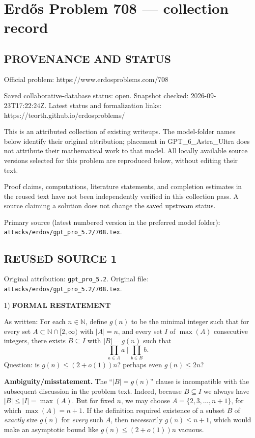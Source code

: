 \section*{Erd\H{o}s Problem 708 --- collection record}

\subsection*{PROVENANCE AND STATUS}
Official problem: https://www.erdosproblems.com/708

Saved collaborative-database status: open.
Snapshot checked: 2026-09-23T17:22:24Z.
Latest status and formalization links: https://teorth.github.io/erdosproblems/

This is an attributed collection of existing writeups. The model-folder names below identify their original attribution; placement in GPT\_6\_Astra\_Ultra does not attribute their mathematical work to that model. All locally available source versions selected for this problem are reproduced below, without editing their text.

Proof claims, computations, literature statements, and completion estimates in the reused text have not been independently verified in this collection pass. A source claiming a solution does not change the saved upstream status.

Primary source (latest numbered version in the preferred model folder): \texttt{attacks/erdos/gpt\_pro\_5.2/708.tex}.

\subsection*{REUSED SOURCE 1}
Original attribution: \texttt{gpt\_pro\_5.2}.
Original file: \texttt{attacks/erdos/gpt\_pro\_5.2/708.tex}.


1) \textbf{FORMAL RESTATEMENT}

As written:
For each $n\in\mathbb{N}$, define $g(n)$ to be the minimal integer such that for every set $A\subset\mathbb{N}\cap[2,\infty)$ with $|A|=n$, and every set $I$ of $\max(A)$ consecutive integers, there exists $B\subseteq I$ with $|B|=g(n)$ such that
\[
\prod_{a\in A} a\ \big|\ \prod_{b\in B} b.
\]
Question: is $g(n)\le (2+o(1))n$? perhaps even $g(n)\le 2n$?

\textbf{Ambiguity/misstatement.}
The ``$|B|=g(n)$'' clause is incompatible with the subsequent discussion in the problem text.
Indeed, because $B\subseteq I$ we always have $|B|\le |I|=\max(A)$.
But for fixed $n$, we may choose $A=\{2,3,\dots,n+1\}$, for which $\max(A)=n+1$.
If the definition required existence of a subset $B$ of \emph{exactly} size $g(n)$ for \emph{every} such $A$, then necessarily $g(n)\le n+1$, which would make an asymptotic bound like $g(n)\le (2+o(1))n$ vacuous.

